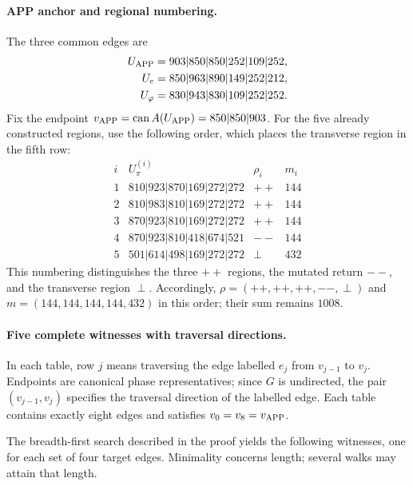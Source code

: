 \paragraph{APP anchor and regional numbering.}
The three common edges are
\begin{equation}
\begin{aligned}
 U_{\rm APP}&=903|850|850|252|109|252,\\
 U_e&=850|963|890|149|252|212,\\
 U_\varphi&=830|943|830|109|252|252.
\end{aligned}
\label{regcl27:anclajes}
\end{equation}
Fix the endpoint
\(v_{\rm APP}=\operatorname{can}A(U_{\rm APP})=850|850|903\).
For the five already constructed regions, use the following order,
which places the transverse region in the fifth row:
\begin{equation}
\begin{array}{c|l|c|r}
 i&U_\pi^{(i)}&\rho_i&m_i\\ \hline
 1&810|923|870|169|272|272&++&144\\
 2&810|983|810|169|272|272&++&144\\
 3&870|923|810|169|272|272&++&144\\
 4&870|923|810|418|674|521&--&144\\
 5&501|614|498|169|272|272&\perp&432
\end{array}
\label{regcl27:regiones}
\end{equation}
This numbering distinguishes the three \(++\) regions, the mutated
return \( -- \), and the transverse region \(\perp\). Accordingly,
\(\rho=(++ ,++ ,++ ,--,\perp)\) and
\(m=(144,144,144,144,432)\) in this order; their sum remains \(1008\).

\paragraph{Five complete witnesses with traversal directions.}
In each table, row \(j\) means traversing the edge labelled \(e_j\)
from \(v_{j-1}\) to \(v_j\). Endpoints are canonical phase representatives;
since \(G\) is undirected, the pair \((v_{j-1},v_j)\) specifies
the traversal direction of the labelled edge.
Each table contains exactly eight edges and satisfies
\(v_0=v_8=v_{\rm APP}\).

The breadth-first search described in the proof yields the following
witnesses, one for each set of four target edges. Minimality concerns
length; several walks may attain that length.
